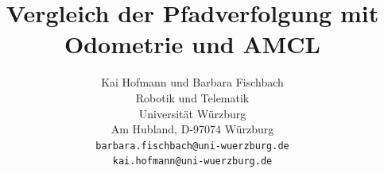 \documentclass[11pt,a4paper]{article}
\begin{document}
\sloppy

\title{\Large\bf Vergleich der Pfadverfolgung mit Odometrie und AMCL }

\author{Kai Hofmann und Barbara Fischbach\\
  Robotik und Telematik \\
  Universit\"at W\"urzburg\\
  Am Hubland, D-97074 W\"urzburg\\
{\small \texttt{barbara.fischbach@uni-wuerzburg.de}}\\
{\small \texttt{kai.hofmann@uni-wuerzburg.de}}}

\date{}




\maketitle


\newpage

\twocolumn
\end{document}
